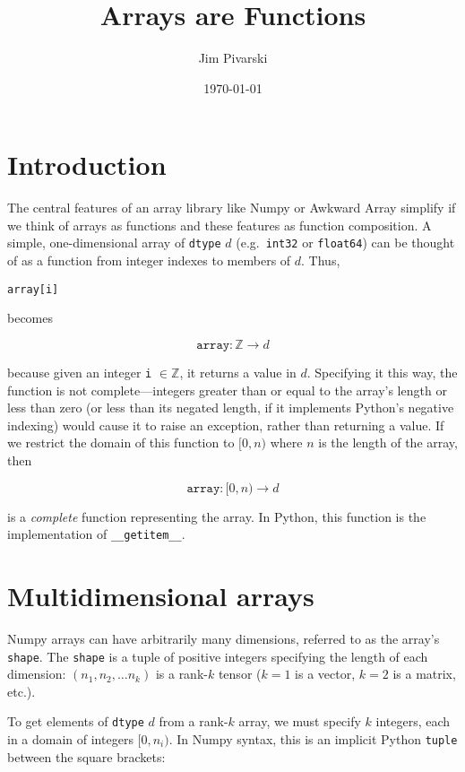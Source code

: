 \documentclass[12pt]{article}
\title{Arrays are Functions}
\author{Jim Pivarski}
\date{\today}
\begin{document}
\maketitle

\section*{Introduction}

The central features of an array library like Numpy or Awkward Array simplify if we think of arrays as functions and these features as function composition. A simple, one-dimensional array of \texttt{dtype} $d$ (e.g.\ \texttt{int32} or \texttt{float64}) can be thought of as a function from integer indexes to members of $d$. Thus,

\begin{center}
\texttt{array[i]}
\end{center}

\noindent becomes

\[ \texttt{array}: \mathbb{Z} \to d \]

\noindent because given an integer \texttt{i} $\in \mathbb{Z}$, it returns a value in $d$. Specifying it this way, the function is not complete---integers greater than or equal to the array's length or less than zero (or less than its negated length, if it implements Python's negative indexing) would cause it to raise an exception, rather than returning a value. If we restrict the domain of this function to $[0, n)$ where $n$ is the length of the array, then

\[ \texttt{array}: [0, n) \to d \]

\noindent is a {\it complete} function representing the array. In Python, this function is the implementation of \texttt{__getitem__}.

\section*{Multidimensional arrays}

Numpy arrays can have arbitrarily many dimensions, referred to as the array's \texttt{shape}. The \texttt{shape} is a tuple of positive integers specifying the length of each dimension: $(n_1, n_2, \ldots n_k)$ is a rank-$k$ tensor ($k = 1$ is a vector, $k = 2$ is a matrix, etc.).

To get elements of \texttt{dtype} $d$ from a rank-$k$ array, we must specify $k$ integers, each in a domain of integers $[0, n_i)$. In Numpy syntax, this is an implicit Python \texttt{tuple} between the square brackets:
\end{document}

